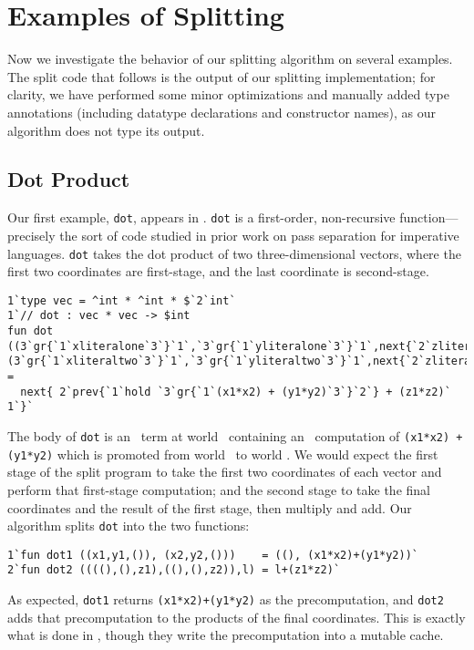  \section{Examples of Splitting}
\label{sec:examples}

Now we investigate the behavior of our splitting algorithm on several examples.
The split code that follows is the output of our splitting implementation; for
clarity, we have performed some minor optimizations and manually added type
annotations (including datatype declarations and constructor names), as our
algorithm does not type its output.

\subsection{Dot Product}

Our first example, \texttt{dot}, appears in \cite{knoblock96}. \texttt{dot} is a
first-order, non-recursive function---precisely the sort of code studied in
prior work on pass separation for imperative languages. \texttt{dot} takes the
dot product of two three-dimensional vectors, where the first two
coordinates are first-stage, and the last coordinate is second-stage. 
%
\begin{lstlisting} 
1`type vec = ^int * ^int * $`2`int`
1`// dot : vec * vec -> $int
fun dot ((3`gr{`1`xliteralone`3`}`1`,`3`gr{`1`yliteralone`3`}`1`,next{`2`zliteralone`1`}),(3`gr{`1`xliteraltwo`3`}`1`,`3`gr{`1`yliteraltwo`3`}`1`,next{`2`zliteraltwo`1`})) = 
  next{ 2`prev{`1`hold `3`gr{`1`(x1*x2) + (y1*y2)`3`}`2`} + (z1*z2)` 1`}`
\end{lstlisting}
%
The body of \texttt{dot} is an \rmint\ term at world \bbtwo\ containing an
\rmint\ computation of \texttt{(x1*x2) + (y1*y2)} which is promoted from world
\bbonep\ to world \bbtwo. We would expect the first stage of the split program
to take the first two coordinates of each vector and perform that first-stage
computation; and the second stage to take the final coordinates and the result
of the first stage, then multiply and add.
Our algorithm splits \texttt{dot} into the two functions:
\begin{lstlisting} 
1`fun dot1 ((x1,y1,()), (x2,y2,()))    = ((), (x1*x2)+(y1*y2))`
2`fun dot2 ((((),(),z1),((),(),z2)),l) = l+(z1*z2)`
\end{lstlisting}
%
As expected, \texttt{dot1} returns \texttt{(x1*x2)+(y1*y2)} as the
precomputation, and \texttt{dot2} adds that precomputation to the products of
the final coordinates. This is exactly what is done in \cite{knoblock96}, though
they write the precomputation into a mutable cache.

